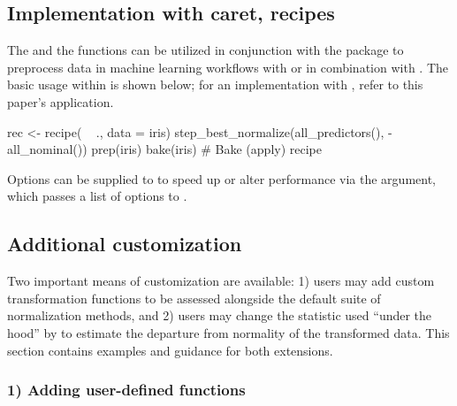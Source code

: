 \hypertarget{implementation-with-caret-recipes}{%
\subsection{Implementation with caret,
recipes}\label{implementation-with-caret-recipes}}

The  and the
 functions can be utilized in
conjunction with the  package to preprocess data in machine
learning workflows with  \citep{tidymodels} or in
combination with . The basic usage within  is
shown below; for an implementation with , refer to this
paper's application.

\begin{Schunk}
\begin{Sinput}
rec <- recipe( ~ ., data = iris)  %
  step_best_normalize(all_predictors(), -all_nominal()) %
  prep(iris) %
  bake(iris)                                                # Bake (apply) recipe
\end{Sinput}
\end{Schunk}

Options can be supplied to
 to speed up or
alter performance via the 
argument, which passes a list of options to .

\hypertarget{additional-customization}{%
\subsection{Additional customization}\label{additional-customization}}

Two important means of customization are available: 1) users may add
custom transformation functions to be assessed alongside the default
suite of normalization methods, and 2) users may change the statistic
used ``under the hood'' by  to estimate the
departure from normality of the transformed data. This section contains
examples and guidance for both extensions.

\hypertarget{adding-user-defined-functions}{%
\subsubsection{1) Adding user-defined
functions}\label{adding-user-defined-functions}}

